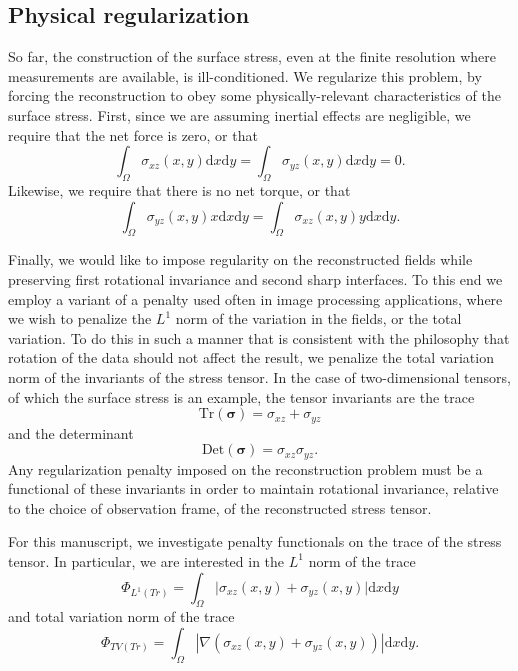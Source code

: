 \documentclass[aps,prl,reprint,twocolumn,groupedaddress,showpacs]{revtex4-1}
\newcommand{\bsigma}{{\boldsymbol\sigma}}
\def\dd{\mbox{d}}
\begin{document}
\subsection{Physical regularization}

So far, the construction of the surface stress, even at the finite
resolution where measurements are available, is ill-conditioned. We 
regularize this problem, by forcing the reconstruction to obey some physically-relevant
characteristics of the surface stress. First, since we are assuming inertial
effects are negligible, we require that the net force is zero, or that
\begin{equation}
\int_\Omega\sigma_{xz}(x,y)\dd x \dd y= \int_\Omega\sigma_{yz}(x,y)\dd x \dd y = 0 .
\end{equation}
Likewise, we require that there is no net torque, or that
\begin{equation}
\int_\Omega\sigma_{yz}(x,y)x \dd x \dd y  = \int_\Omega\sigma_{xz}(x,y)y \dd x \dd y .
\end{equation}
 
 Finally, we would like to impose regularity on the reconstructed fields while preserving first
 rotational invariance and second sharp interfaces. To this end we employ a variant of a penalty
 used often in image processing applications, where we wish to penalize the $L^1$ norm of the
 variation in the fields, or the total variation. To do this in such a manner that is consistent with
the philosophy that rotation of the data should not affect the result, we penalize the total variation
norm of the invariants of the stress tensor. In the case of two-dimensional tensors, of which the surface stress
is an example, the tensor invariants are the trace
\begin{equation}
\textrm{Tr}(\bsigma) = \sigma_{xz} + \sigma_{yz}
\end{equation}
and the determinant
\begin{equation}
\textrm{Det}(\bsigma) = \sigma_{xz} \sigma_{yz}.
\end{equation}
Any regularization penalty imposed on the reconstruction problem must be a functional
of these invariants in order to maintain rotational invariance, relative to the choice of observation frame,
 of the reconstructed stress tensor.
 
For this manuscript, we  investigate penalty functionals on the trace of the stress tensor. In particular, we are interested in the $L^1$ norm of the trace
\begin{equation}
\Phi_{L^1(Tr)} = \int_\Omega \vert \sigma_{xz}(x,y) + \sigma_{yz}(x,y)  \vert \dd x\dd y
\label{eq:PhiL1Tr}
\end{equation}
and total variation norm of the trace
%
\begin{equation}
\Phi_{TV(Tr)} =  \int_\Omega | \nabla(\sigma_{xz}(x,y) + \sigma_{yz}(x,y) ) | \dd x\dd y.
\label{eq:PhiTVTr}
\end{equation}
\end{document}
